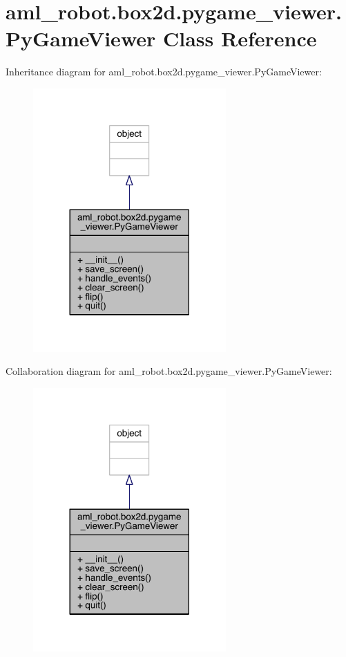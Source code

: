 \hypertarget{classaml__robot_1_1box2d_1_1pygame__viewer_1_1_py_game_viewer}{}\section{aml\+\_\+robot.\+box2d.\+pygame\+\_\+viewer.\+Py\+Game\+Viewer Class Reference}
\label{classaml__robot_1_1box2d_1_1pygame__viewer_1_1_py_game_viewer}


Inheritance diagram for aml\+\_\+robot.\+box2d.\+pygame\+\_\+viewer.\+Py\+Game\+Viewer\+:\nopagebreak
\begin{figure}[H]
\begin{center}
\leavevmode
\includegraphics[width=209pt]{classaml__robot_1_1box2d_1_1pygame__viewer_1_1_py_game_viewer__inherit__graph}
\end{center}
\end{figure}


Collaboration diagram for aml\+\_\+robot.\+box2d.\+pygame\+\_\+viewer.\+Py\+Game\+Viewer\+:\nopagebreak
\begin{figure}[H]
\begin{center}
\leavevmode
\includegraphics[width=209pt]{classaml__robot_1_1box2d_1_1pygame__viewer_1_1_py_game_viewer__coll__graph}
\end{center}
\end{figure}

